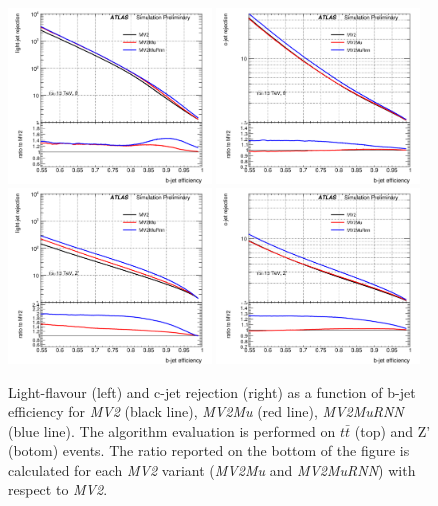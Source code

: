 \begin{figure}[htbp]
  \centering
 \includegraphics[width=0.48\textwidth]{figures/RNN/LRej_ttbar_combtagger.png}
 \includegraphics[width=0.48\textwidth]{figures/RNN/CRej_ttbar_combtagger.png}\\
 \includegraphics[width=0.48\textwidth]{figures/RNN/LRej_Zprime_combtagger.png}
 \includegraphics[width=0.48\textwidth]{figures/RNN/CRej_Zprime_combtagger.png}

 \caption{Light-flavour (left) and c-jet rejection (right) as a function of b-jet efficiency for \textit{MV2} (black line), \textit{MV2Mu} (red line), \textit{MV2MuRNN} (blue line). The algorithm evaluation is performed on $t\bar t$ (top) and Z' (botom) events. The ratio reported on the bottom of the figure is calculated for each \textit{MV2} variant (\textit{MV2Mu} and \textit{MV2MuRNN}) with respect to \textit{MV2}.}
  \label{fig:combtagger}
\end{figure}
